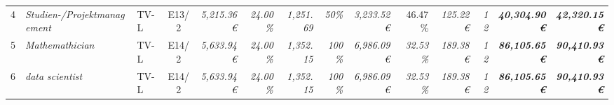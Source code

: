 \begin{table}[]
\begin{tabular}{clllcrrrrrrrrrr}
4                                                                                       & \multicolumn{2}{l}{\cellcolor[HTML]{FFFF99}\textit{Studien-/Projektmanagement}}       & \cellcolor[HTML]{FFFF99}TV-L      & \cellcolor[HTML]{FFFF99}E13/2                & \cellcolor[HTML]{FFFF99}\textit{5,215.36 €}         & \textit{24.00\%}                                      & \textit{1,251.69}                            & \cellcolor[HTML]{FFFF99}\textit{50\%}                   & \cellcolor[HTML]{92D050}\textit{3,233.52 €}  & 46.47 \%                                       & \cellcolor[HTML]{92D050}\textit{125.22 €}    & \cellcolor[HTML]{FFFF99}\textit{12}          & \cellcolor[HTML]{BFBFBF}\textit{\textbf{40,304.90 €}}           & \textit{\textbf{42,320.15 €}}                                                                 \\
5                                                                                       & \multicolumn{2}{l}{\cellcolor[HTML]{FFFF99}\textit{Mathemathician}}                   & \cellcolor[HTML]{FFFF99}TV-L      & \cellcolor[HTML]{FFFF99}E14/2                & \cellcolor[HTML]{FFFF99}\textit{5,633.94 €}         & \textit{24.00\%}                                      & \textit{1,352.15}                            & \cellcolor[HTML]{FFFF99}\textit{100\%}                  & \cellcolor[HTML]{92D050}\textit{6,986.09 €}  & \cellcolor[HTML]{FFFF99}\textit{32.53\%}       & \cellcolor[HTML]{92D050}\textit{189.38 €}    & \cellcolor[HTML]{FFFF99}\textit{12}          & \cellcolor[HTML]{BFBFBF}\textit{\textbf{86,105.65 €}}           & \textit{\textbf{90,410.93 €}}                                                                 \\
6                                                                                       & \multicolumn{2}{l}{\cellcolor[HTML]{FFFF99}\textit{data scientist}}                   & \cellcolor[HTML]{FFFF99}TV-L      & \cellcolor[HTML]{FFFF99}E14/2                & \cellcolor[HTML]{FFFF99}\textit{5,633.94 €}         & \textit{24.00\%}                                      & \textit{1,352.15}                            & \cellcolor[HTML]{FFFF99}\textit{100\%}                  & \cellcolor[HTML]{92D050}\textit{6,986.09 €}  & \cellcolor[HTML]{FFFF99}\textit{32.53\%}       & \cellcolor[HTML]{92D050}\textit{189.38 €}    & \cellcolor[HTML]{FFFF99}\textit{12}          & \cellcolor[HTML]{BFBFBF}\textit{\textbf{86,105.65 €}}           & \textit{\textbf{90,410.93 €}}                                                                 \\

\end{tabular}
\end{table}
